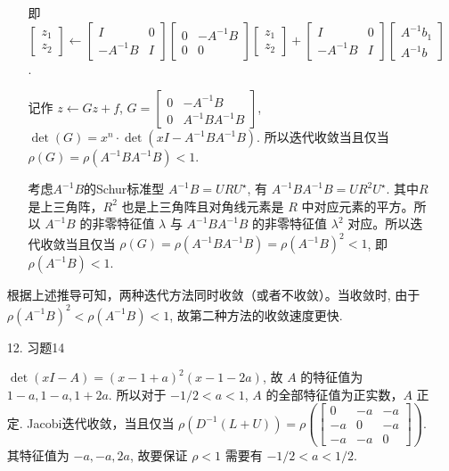 \documentclass{article}
\begin{document}
\begin{spacing}{1.5}
\begin{itemize}
\begin{itemize}
        即 $\left[\begin{array}{c}z_1\\z_2\end{array}\right]\leftarrow \left[\begin{array}{cc}I&0\\-A^{-1}B&I\end{array}\right]\left[\begin{array}{cc}0&-A^{-1}B\\0&0\end{array}\right]\left[\begin{array}{c}z_1\\z_2\end{array}\right] + \left[\begin{array}{cc}I&0\\-A^{-1}B&I\end{array}\right]\left[\begin{array}{c}A^{-1}b_1\\A^{-1}b\end{array}\right]$.

        记作 $z \leftarrow Gz + f$, $G = \left[\begin{array}{cc}0&-A^{-1}B\\0&A^{-1}BA^{-1}B\end{array}\right]$, $\det(G) = x^n\cdot\det(xI - A^{-1}BA^{-1}B)$. 所以迭代收敛当且仅当 $\rho(G) = \rho (A^{-1}BA^{-1}B) < 1$.

        考虑$A^{-1}B$的Schur标准型 $A^{-1}B = UR U^\star$, 有 $A^{-1}BA^{-1}B = UR^2U^\star$. 其中$R$ 是上三角阵，$R^2$ 也是上三角阵且对角线元素是 $R$ 中对应元素的平方。所以 $A^{-1}B$ 的非零特征值 $\lambda$ 与 $A^{-1}BA^{-1}B$ 的非零特征值 $\lambda^2$ 对应。所以迭代收敛当且仅当 $\rho(G) = \rho(A^{-1}BA^{-1}B) = \rho(A^{-1}B)^2 < 1$, 即 $\rho(A^{-1}B)<1$.
    \end{itemize}
    根据上述推导可知，两种迭代方法同时收敛（或者不收敛）。当收敛时, 由于 $\rho(A^{-1}B)^2 < \rho(A^{-1}B) < 1$, 故第二种方法的收敛速度更快.

    \item [12.] 习题14
    
    $\det(xI - A) = (x - 1 + a)^2 (x - 1 - 2a)$, 故 $A$ 的特征值为 $1 - a, 1 - a, 1 + 2a$. 所以对于 $-1/2 < a < 1$, $A$ 的全部特征值为正实数，$A$ 正定. Jacobi迭代收敛，当且仅当 $\rho(D^{-1}(L+U)) = \rho \left(\left[\begin{array}{ccc}0&-a&-a\\-a&0&-a\\-a&-a&0\end{array}\right]\right)$. 其特征值为 $-a, -a ,2a$, 故要保证 $\rho < 1$ 需要有 $-1/2 < a < 1/2$.


\end{itemize}
\end{spacing}
\end{document}
